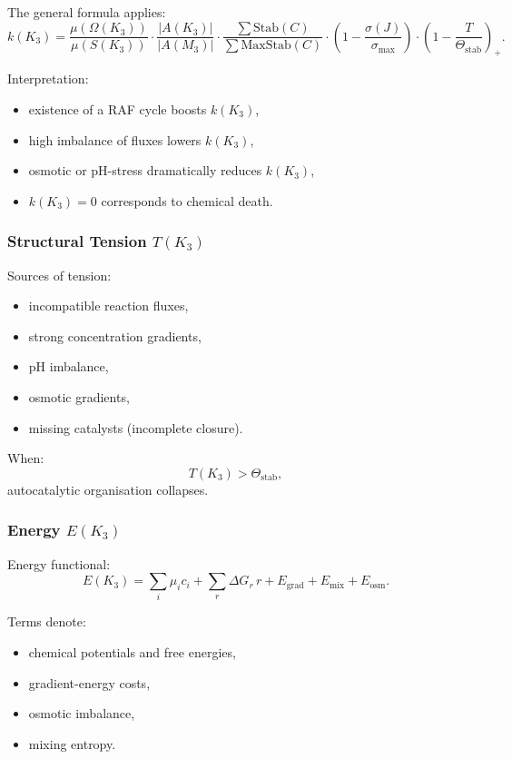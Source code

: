 The general formula applies:
\[
k(K_3) = 
\frac{\mu(\Omega(K_3))}{\mu(S(K_3))}
\cdot
\frac{|A(K_3)|}{|A(M_3)|}
\cdot
\frac{\sum \mathrm{Stab}(C)}{\sum \mathrm{MaxStab}(C)}
\cdot
(1 - \frac{\sigma(J)}{\sigma_{\max}})
\cdot
(1 - \frac{T}{\Theta_{\mathrm{stab}}})_+.
\]

Interpretation:
\begin{itemize}
    \item existence of a RAF cycle boosts $k(K_3)$,
    \item high imbalance of fluxes lowers $k(K_3)$,
    \item osmotic or pH-stress dramatically reduces $k(K_3)$,
    \item $k(K_3)=0$ corresponds to chemical death.
\end{itemize}

\subsubsection{Structural Tension \texorpdfstring{$T(K_3)$}{T(K_3)}}

Sources of tension:
\begin{itemize}
    \item incompatible reaction fluxes,
    \item strong concentration gradients,
    \item pH imbalance,
    \item osmotic gradients,
    \item missing catalysts (incomplete closure).
\end{itemize}

When:
\[
T(K_3) > \Theta_{\mathrm{stab}},
\]
autocatalytic organisation collapses.

\subsubsection{Energy \texorpdfstring{$E(K_3)$}{E(K_3)}}

Energy functional:
\[
E(K_3) =
\sum_i \mu_i c_i +
\sum_r \Delta G_r\, r +
E_{\mathrm{grad}} + E_{\mathrm{mix}} + E_{\mathrm{osm}}.
\]

Terms denote:
\begin{itemize}
    \item chemical potentials and free energies,
    \item gradient-energy costs,
    \item osmotic imbalance,
    \item mixing entropy.
\end{itemize}

